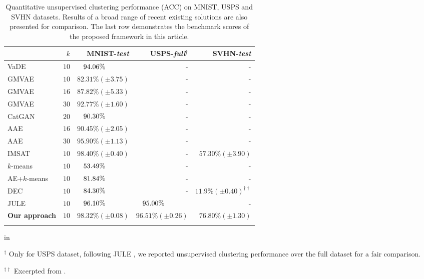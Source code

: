 \documentclass{article} \usepackage{iclr2018_conference,times}
\newcommand{\ra}[1]{\renewcommand{\arraystretch}{#1}}
\begin{document}
\begin{table}[h]\centering
\ra{1.2}
\caption{Quantitative unsupervised clustering performance (ACC) on MNIST, USPS and SVHN datasets. Results of a broad range of recent existing solutions are also presented for comparison. The last row demonstrates the benchmark scores of the proposed framework in this article.}
\vskip 0.05in
\begin{tabular}{@{}lrrrr@{}}\toprule
							  	&$k$ & MNIST-\textit{test}  	& USPS-\textit{full}$^\dagger$	& SVHN-\textit{test}	\\
\midrule
VaDE \citep{JiangZTTZ17}		  	&$10$& $94.06\%\hskip 3.35em$ 	& -						& -	\\
GMVAE \citep{DilokthanakulMG16}	&$10$& $82.31\%(\pm 3.75)$		& -						& -	\\
GMVAE \citep{DilokthanakulMG16}	&$16$& $87.82\%(\pm 5.33)$		& -						& -	\\
GMVAE \citep{DilokthanakulMG16}	&$30$& $92.77\%(\pm 1.60)$		& -						& -	\\		
\midrule
CatGAN \citep{Springenberg15}  	&$20$& $90.30\%\hskip 3.35em$ 	& -						& - \\
AAE \citep{MakhzaniSJG15}      	&$16$& $90.45\%(\pm 2.05)$		& -						& - \\
AAE \citep{MakhzaniSJG15}      	&$30$& $95.90\%(\pm 1.13)$		& -						& - \\
IMSAT \citep{HuMTMS17}      	&$10$& $98.40\%(\pm 0.40)$		& -						& $57.30\%(\pm 3.90)$ \\
\midrule
$k$-means \citep{XieGF16}	    &$10$& $53.49\%\hskip 3.35em$	& -						& - \\
AE+$k$-means \citep{XieGF16}	&$10$& $81.84\%\hskip 3.35em$	& -						& - \\
\midrule
DEC \citep{XieGF16}	          	&$10$& $84.30\%\hskip 3.35em$	& -						& $11.9\%(\pm0.40)^{\dagger\dagger}$ \\
\midrule
JULE \citep{YangPB16}	      	&$10$& $96.10\%\hskip 3.35em$	& $95.00\%\hskip 3.35em$& -	\\
\midrule
\textbf{Our approach} 	      	&$10$& $98.32\%(\pm 0.08)$		& $96.51\%(\pm 0.26)$	& $76.80\%(\pm 1.30)$	\\
\bottomrule
\label{tab:pseudo_all_acc}
\end{tabular}
 in	
\raggedright \tiny $ ^\dagger$ Only for USPS dataset, following JULE \citep{YangPB16}, we reported unsupervised clustering performance over the full dataset for a fair comparison.\\
\raggedright \tiny $ ^{\dagger\dagger}$ Excerpted from \citep{HuMTMS17}.
\end{table}
\end{document}
